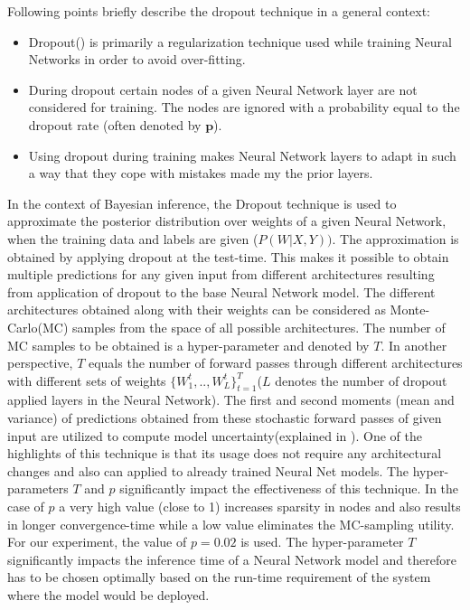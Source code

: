 	Following points briefly describe the dropout technique in a general context:
	\begin{itemize}
		\item Dropout(\cite{srivastava2014dropout}) is primarily a regularization technique used while training Neural Networks in order to avoid over-fitting.
		\item During dropout certain nodes of a given Neural Network layer are not considered for training. The nodes are ignored with a probability equal to the dropout rate (often denoted by $\textbf{p}$).
		\item Using dropout during training makes Neural Network layers to adapt in such a way that they cope with mistakes made my the prior layers. 
		
	\end{itemize}
	
	In the context of Bayesian inference, the Dropout technique is used to approximate the posterior distribution over weights of a given Neural Network, when the training data and labels are given ($P(W|X,Y))$. The approximation is obtained by applying dropout at the test-time. This makes it possible to obtain multiple predictions for any given input from different architectures resulting from application of dropout to the base Neural Network model. The different architectures obtained along with their weights can be considered as Monte-Carlo(MC) samples from the space of all possible architectures. The number of MC samples to be obtained is a hyper-parameter and denoted by $T$. In another perspective, $T$ equals the number of forward passes through different architectures with different sets of weights $\{W_{1}^t,..,W_{L}^t\}_{t=1}^T$($L$ denotes the number of dropout applied layers in the Neural Network). The first and second moments (mean and variance) of predictions obtained from these stochastic forward passes of given input are utilized to compute model uncertainty(explained in  \cite{adf_mcdo_uncertainty_estimation}). One of the highlights of this technique is that its usage does not require any architectural changes and also can applied to already trained Neural Net models. The hyper-parameters $T$ and $p$ significantly impact the effectiveness of this technique. In the case of $p$ a very high value (close to 1) increases sparsity in nodes and also results in longer convergence-time while a low value eliminates the MC-sampling utility. For our experiment, the value of $p=0.02$ is used. The hyper-parameter $T$ significantly impacts the inference time of a Neural Network model and therefore has to be chosen optimally based on the run-time requirement of the system where the model would be deployed.
	
